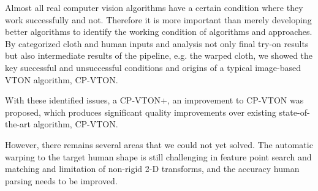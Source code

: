 \documentclass[runningheads]{llncs}
\begin{document}
Almost all real computer vision algorithms have a certain condition where they work successfully and not. Therefore it is more important than merely developing better algorithms to identify the working condition of algorithms and approaches.  By categorized cloth and human inputs and analysis not only final try-on results but also intermediate results of the pipeline, e.g. the warped cloth, we showed the key successful and unsuccessful conditions and origins of a typical image-based VTON algorithm, CP-VTON. 

With these identified issues, a CP-VTON+, an improvement to CP-VTON was proposed, which produces significant quality improvements over existing state-of-the-art algorithm, CP-VTON. 

However, there remains several areas that we could not yet solved. The automatic warping to the target human shape is still challenging in feature point search and matching and limitation of non-rigid 2-D transforms, and the accuracy human parsing  needs to be improved.
  
     
\clearpage
%
%


\end{document}
